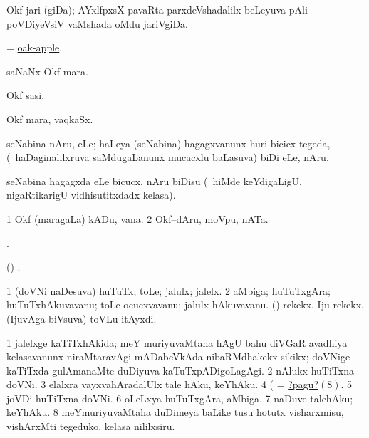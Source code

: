 \bentry
{}
\gl{\nA}
\bmng
Okf jari (giDa); AYxlfpxsX pavaRta parxdeVshadalilx beLeyuva pAli poVDiyeVsiV vaMshada oMdu jariVgiDa. 
\emng
\eentry

\bentry
{}
\gl{\nA}
\bmng
= \hyperlink{oak-apple}{oak-apple}. 
\emng
\eentry

\bentry
{}
\gl{\nA}
\bmng
saNaNx Okf mara. 
\emng
\eentry

\bentry
{}
\gl{\nA}
\bmng
Okf sasi. 
\emng
\eentry

\bentry
{}
\gl{\nA}
\bmng
Okf mara, vaqkaSx. 
\emng
\eentry

\bentry
{}
\gl{\nA}
\bmng
seNabina nAru, eLe; haLeya (seNabina) hagagxvanunx huri bicicx tegeda, (\kanmu\ haDaginalilxruva saMdugaLanunx mucacxlu baLasuva) biDi eLe, nAru. 
\emng

\noindent
\gl{\pagu}
\bmng
{} seNabina hagagxda eLe bicucx, nAru biDisu (\kanmu\ hiMde keYdigaLigU, nigaRtikarigU vidhisutitxdadx kelasa). 
\emng
\eentry

\bentry
{}
\gl{\nA}
\bmng
\bnum
\num{1} Okf (maragaLa) kADu, vana. 
\num{2} Okf--dAru, moVpu, nATa. 
\enum
\emng
\eentry

\bentry
{}
\gl{\saMkiSx}
\bmng
{}. 
\emng
\eentry

\bentry
{}
\gl{\saMkiSx}
\bmng
(\birx) . 
\emng
\eentry

\bentry
{}
\gl{\nA}
\bmng
\bnum
\num{1} (doVNi naDesuva) huTuTx; toLe; jalulx; jalelx. 
\num{2} aMbiga; huTuTxgAra; huTuTxhAkuvavanu; toLe ocucxvavanu; jalulx hAkuvavanu. 
 (\rUpa) 
\banum
{} rekekx. 
 Iju rekekx. 
 (IjuvAga biVsuva) toVLu itAyxdi. 
\eanum
\numie
\enum
\emng

\noindent
\gl{\pagu}
\bmng
\bnum
\num{1}  jalelxge kaTiTxhAkida; meY muriyuvaMtaha hAgU bahu diVGaR avadhiya kelasavanunx niraMtaravAgi mADabeVkAda nibaRMdhakekx sikikx; doVNige kaTiTxda gulAmanaMte duDiyuva kaTuTxpADigoLagAgi. 
\num{2}  nAlukx huTiTxna doVNi. 
\num{3}  elalxra vayxvahAradalUlx tale hAku, keYhAku. 
\num{4}  (  = \hyperlink{oar1pagu8}{?pagu?\((8)\)}. 
\num{5}  joVDi huTiTxna doVNi. 
\num{6}  oLeLxya huTuTxgAra, aMbiga. 
\num{7}  naDuve talehAku; keYhAku. 
\hypertarget{oar1pagu8}{} 
\num{8}  meYmuriyuvaMtaha duDimeya baLike tusu hotutx visharxmisu, vishArxMti tegeduko, kelasa nililxsiru. 
\enum
\emng
\eentry

